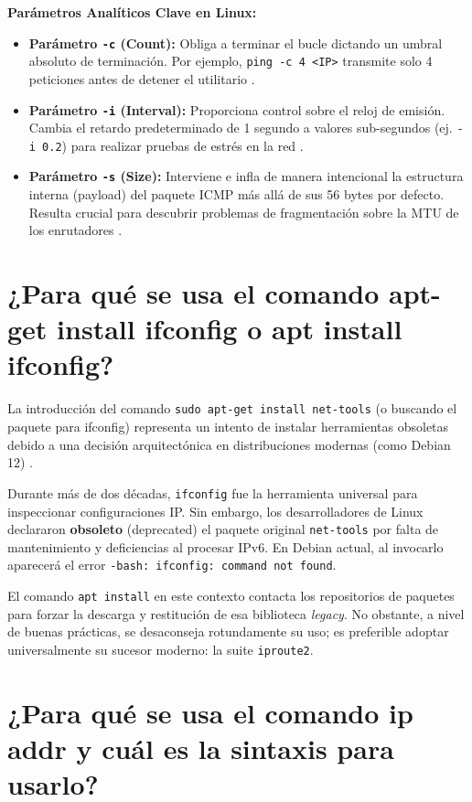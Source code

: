 \documentclass[a4paper,12pt]{article}
\begin{document}
\textbf{Parámetros Analíticos Clave en Linux:}
\begin{itemize}
    \item \textbf{Parámetro \texttt{-c} (Count):} Obliga a terminar el bucle dictando un umbral absoluto de terminación. Por ejemplo, \texttt{ping -c 4 <IP>} transmite solo 4 peticiones antes de detener el utilitario \cite{ref35}.
    \item \textbf{Parámetro \texttt{-i} (Interval):} Proporciona control sobre el reloj de emisión. Cambia el retardo predeterminado de 1 segundo a valores sub-segundos (ej. \texttt{-i 0.2}) para realizar pruebas de estrés en la red \cite{ref35}.
    \item \textbf{Parámetro \texttt{-s} (Size):} Interviene e infla de manera intencional la estructura interna (payload) del paquete ICMP más allá de sus 56 bytes por defecto. Resulta crucial para descubrir problemas de fragmentación sobre la MTU de los enrutadores \cite{ref35}.
\end{itemize}

\section{¿Para qué se usa el comando apt-get install ifconfig o apt install ifconfig?}

La introducción del comando \texttt{sudo apt-get install net-tools} (o buscando el paquete para ifconfig) representa un intento de instalar herramientas obsoletas debido a una decisión arquitectónica en distribuciones modernas (como Debian 12) \cite{ref26}. 

Durante más de dos décadas, \texttt{ifconfig} fue la herramienta universal para inspeccionar configuraciones IP. Sin embargo, los desarrolladores de Linux declararon \textbf{obsoleto} (deprecated) el paquete original \texttt{net-tools} por falta de mantenimiento y deficiencias al procesar IPv6. En Debian actual, al invocarlo aparecerá el error \texttt{-bash: ifconfig: command not found}. 

El comando \texttt{apt install} en este contexto contacta los repositorios de paquetes para forzar la descarga y restitución de esa biblioteca \textit{legacy}. No obstante, a nivel de buenas prácticas, se desaconseja rotundamente su uso; es preferible adoptar universalmente su sucesor moderno: la suite \texttt{iproute2}.

\section{¿Para qué se usa el comando ip addr y cuál es la sintaxis para usarlo?}
\end{document}

